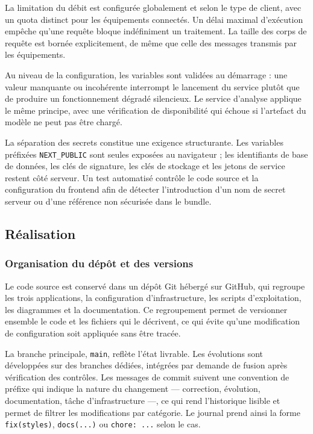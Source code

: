 La limitation du débit est configurée globalement et selon le type de client, avec un quota distinct pour les équipements connectés. Un délai maximal d'exécution empêche qu'une requête bloque indéfiniment un traitement. La taille des corps de requête est bornée explicitement, de même que celle des messages transmis par les équipements.

Au niveau de la configuration, les variables sont validées au démarrage : une valeur manquante ou incohérente interrompt le lancement du service plutôt que de produire un fonctionnement dégradé silencieux. Le service d'analyse applique le même principe, avec une vérification de disponibilité qui échoue si l'artefact du modèle ne peut pas être chargé.

La séparation des secrets constitue une exigence structurante. Les variables préfixées \texttt{NEXT\_PUBLIC} sont seules exposées au navigateur ; les identifiants de base de données, les clés de signature, les clés de stockage et les jetons de service restent côté serveur. Un test automatisé contrôle le code source et la configuration du frontend afin de détecter l'introduction d'un nom de secret serveur ou d'une référence non sécurisée dans le bundle.

\subsection{Réalisation}

\subsubsection{Organisation du dépôt et des versions}

Le code source est conservé dans un dépôt Git hébergé sur GitHub, qui regroupe les trois applications, la configuration d'infrastructure, les scripts d'exploitation, les diagrammes et la documentation. Ce regroupement permet de versionner ensemble le code et les fichiers qui le décrivent, ce qui évite qu'une modification de configuration soit appliquée sans être tracée.

La branche principale, \texttt{main}, reflète l'état livrable. Les évolutions sont développées sur des branches dédiées, intégrées par demande de fusion après vérification des contrôles. Les messages de commit suivent une convention de préfixe qui indique la nature du changement — correction, évolution, documentation, tâche d'infrastructure —, ce qui rend l'historique lisible et permet de filtrer les modifications par catégorie. Le journal prend ainsi la forme \texttt{fix(styles)}, \texttt{docs(...)} ou \texttt{chore: ...} selon le cas.

